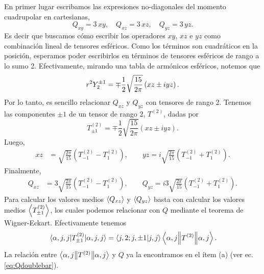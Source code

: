 \documentclass[10pt, a4paper]{article}
\numberwithin{equation}{subsection}
\begin{document}
En primer lugar escribamos las expresiones no-diagonales del momento
cuadrupolar en cartesianas,
\begin{equation}
  Q_{xy} = 3\,xy, \quad Q_{xz} = 3\,xz, \quad Q_{yz} = 3\,yz.
\end{equation}
Es decir que buscamos cómo escribir los operadores $xy$, $xz$ e $yz$ como
combinación lineal de tensores esféricos. Como los términos son cuadráticos en
la posición, esperamos poder escribirlos en términos de tensores esféricos
de rango a lo sumo 2. Efectivamente, mirando una tabla de armónicos
esféricos, notemos que
\begin{equation}
  r^2\SphericalHarmonic{2}{\pm1} = \mp\frac{1}{2}\sqrt{\frac{15}{2\pi}}
  \left(xz \pm iyz\right).
\end{equation}
Por lo tanto, es sencillo relacionar $Q_{xz}$ y $Q_{yz}$ con tensores de rango
2. Tenemos las componentes $\pm1$ de un tensor de rango 2, $T^{(2)}$, dadas por
\begin{equation}
  T^{(2)}_{\pm1} = \mp\frac{1}{2}\sqrt{\frac{15}{2\pi}}
  \left(xz \pm iyz\right).
\end{equation}
Luego,
\begin{align}
  xz &= \sqrt{\frac{2\pi}{15}}\left(T^{(2)}_{-1} - T^{(2)}_{1}\right), \qquad
  yz = i\sqrt{\frac{2\pi}{15}}\left(T^{(2)}_{-1} + T^{(2)}_{1}\right).
\end{align}
Finalmente,
\begin{align}
  Q_{xz} &= 3\sqrt{\frac{2\pi}{15}}\left(T^{(2)}_{-1} - T^{(2)}_{1}\right), \qquad
  Q_{yz} = i3\sqrt{\frac{2\pi}{15}}\left(T^{(2)}_{-1} + T^{(2)}_{1}\right).
\end{align}
Para calcular los valores medios $\expval{Q_{xz}}$ y $\expval{Q_{yz}}$ basta
con calcular los valores medios $\expval{T^{(2)}_{\pm1}}$, los cuales podemos
relacionar con $Q$ mediante el teorema de Wigner-Eckart. Efectivamente tenemos
\begin{align}
  \expval{T^{(2)}_{\pm1}}{\alpha,j,j} = \braket{{j},{2};{j},{\pm1}}{{j},{j}}
    \left\langle{\alpha,j}\middle\|{T^{(2)}}\middle\|{\alpha,j}\right\rangle.
\end{align}
La relación entre $\left\langle{\alpha,j}\middle\|{T^{(2)}}\middle\|{\alpha,j}\right\rangle$ y $Q$ ya la
encontramos en el ítem (a) (ver ec. \eqref{eq:Qdoublebar}).
\end{document}
